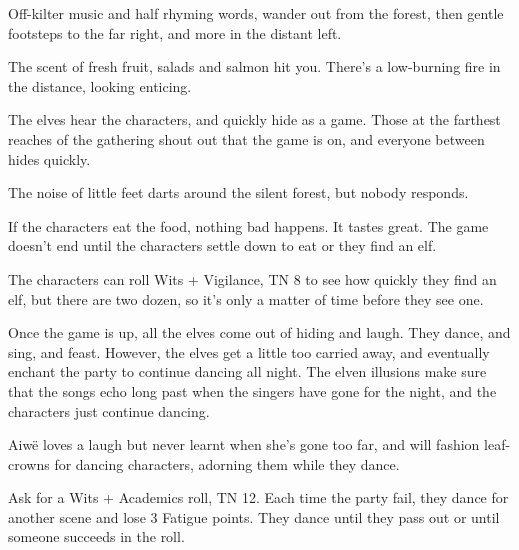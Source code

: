 \begin{multicols}{2}
\begin{boxtext}

	Off-kilter music and half rhyming words, wander out from the forest, then gentle footsteps to the far right, and more in the distant left.

	The scent of fresh fruit, salads and salmon hit you.  There's a low-burning fire in the distance, looking enticing.

\end{boxtext}

The elves hear the characters, and quickly hide as a game.  Those at the farthest reaches of the gathering shout out that the game is on, and everyone between hides quickly.

\begin{boxtext}

	The noise of little feet darts around the silent forest, but nobody responds.

\end{boxtext}

If the characters eat the food, nothing bad happens.  It tastes great.  The game doesn't end until the characters settle down to eat or they find an elf.

The characters can roll Wits + Vigilance, TN 8 to see how quickly they find an elf, but there are two dozen, so it's only a matter of time before they see one.

Once the game is up, all the elves come out of hiding and laugh.  They dance, and sing, and feast.  However, the elves get a little too carried away, and eventually enchant the party to continue dancing all night.  The elven illusions make sure that the songs echo long past when the singers have gone for the night, and the characters just continue dancing.
 

\elf

Aiw\"{e} loves a laugh but never learnt when she's gone too far, and will fashion leaf-crowns for dancing characters, adorning them while they dance.

\columnbreak


\elf


\elvenenchanter

Ask for a Wits + Academics roll, TN 12.  Each time the party fail, they dance for another scene and lose 3 Fatigue points.  They dance until they pass out or until someone succeeds in the roll.


\end{multicols}
